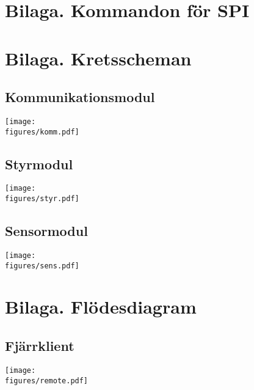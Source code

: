 \documentclass[main.tex]{subfiles}
\begin{document}
\pagestyle{empty}

\begin{appendices}
    \newpage
    \section{Bilaga. Kommandon för SPI}
    \label{bcmds}
    

    \begin{landscape}
    \section{Bilaga. Kretsscheman}
    
    \subsection{Kommunikationsmodul}
    \label{cdiag:comm}
	    \texttt{[image: \\figures/komm.pdf]}

    \subsection{Styrmodul}
    \label{cdiag:ctrl}
	    \texttt{[image: \\figures/styr.pdf]}

    \subsection{Sensormodul}
    \label{cdiag:sens}
	    \texttt{[image: \\figures/sens.pdf]}

    \section{Bilaga. Flödesdiagram}

    \subsection{Fjärrklient}
    \label{flow:remote}
	    \texttt{[image: \\figures/remote.pdf]}

    \end{landscape}
\end{appendices}
\end{document}

